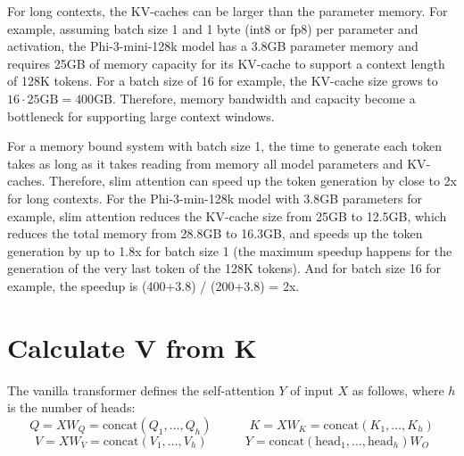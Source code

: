 \documentclass{article}
\numberwithin{equation}{section} %
\begin{document}
For long contexts, the KV-caches can be larger than the parameter memory. For example, assuming batch size 1 and 1 byte (int8 or fp8) per parameter and activation, the Phi-3-mini-128k model has a 3.8GB parameter memory and requires 25GB of memory capacity for its KV-cache to support a context length of 128K tokens. For a batch size of 16 for example, the KV-cache size grows to $16 \cdot 25\text{GB} = 400\text{GB}$. Therefore, memory bandwidth and capacity become a bottleneck for supporting large context windows.

For a memory bound system with batch size 1, the time to generate each token takes as long as it takes reading from memory all model parameters and KV-caches. Therefore, slim attention can speed up the token generation by close to 2x for long contexts. For the Phi-3-min-128k model with 3.8GB parameters for example, slim attention reduces the KV-cache size from 25GB to 12.5GB, which reduces the total memory from 28.8GB to 16.3GB, and speeds up the token generation by up to 1.8x for batch size 1 (the maximum speedup happens for the generation of the very last token of the 128K tokens). And for batch size 16 for example, the speedup is (400+3.8) / (200+3.8) = 2x.

\section{Calculate V from K}
The vanilla transformer \citep{vanilla} defines the self-attention $Y$ of input $X$ as follows, where $h$ is the number of heads:
\begin{equation}
  Q = X W_Q = \text{concat} \left( Q_1, \ldots, Q_h \right) \qquad \quad K = X W_K = \text{concat} \left( K_1, \ldots, K_h \right) \label{eq4}
\end{equation}
\begin{equation}
  V = X W_V = \text{concat} \left( V_1, \ldots, V_h \right) \qquad \quad Y = \text{concat} \left( \text{head}_1, \ldots, \text{head}_h \right) W_O  \label{eq5}
\end{equation}
\end{document}
